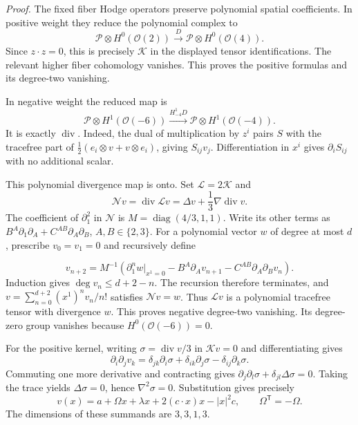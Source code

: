 \documentclass[
  english,
  11pt,
  reqno]{amsart}
\begin{document}
\emph{Proof.} The fixed fiber Hodge operators preserve polynomial
spatial coefficients. In positive weight they reduce the polynomial
complex to \[
\mathcal P\otimes H^0(\mathcal O(2))
\xrightarrow{D}\mathcal P\otimes H^0(\mathcal O(4)).
\] Since \(z\cdot z=0\), this is precisely \(\mathcal K\) in the
displayed tensor identifications. The relevant higher fiber cohomology
vanishes. This proves the positive formulas and its degree-two
vanishing.

In negative weight the reduced map is \[
\mathcal P\otimes H^1(\mathcal O(-6))
\xrightarrow{H_{-4}^1D}\mathcal P\otimes H^1(\mathcal O(-4)).
\] It is exactly \(\operatorname{div}\). Indeed, the dual of
multiplication by \(z^i\) pairs \(S\) with the tracefree part of
\(\tfrac12(e_i\otimes v+v\otimes e_i)\), giving \(S_{ij}v_j\).
Differentiation in \(x^i\) gives \(\partial_iS_{ij}\) with no additional
scalar.

This polynomial divergence map is onto. Set \(\mathcal L=2\mathcal K\)
and \[
\mathcal N v=\operatorname{div}\mathcal Lv
=\Delta v+\frac13\nabla\operatorname{div}v.
\] The coefficient of \(\partial_1^2\) in \(\mathcal N\) is
\(M=\operatorname{diag}(4/3,1,1)\). Write its other terms as
\(B^A\partial_1\partial_A+C^{AB}\partial_A\partial_B\),
\(A,B\in\{2,3\}\). For a polynomial vector \(w\) of degree at most
\(d\), prescribe \(v_0=v_1=0\) and recursively define

\label{eq:online-polynomial-navier-recursion} \[
v_{n+2}=M^{-1}\left(
\partial_1^n w|_{x^1=0}
-B^A\partial_Av_{n+1}
-C^{AB}\partial_A\partial_Bv_n
\right).
\] Induction gives \(\deg v_n\le d+2-n\). The recursion therefore
terminates, and \(v=\sum_{n=0}^{d+2}(x^1)^nv_n/n!\) satisfies
\(\mathcal Nv=w\). Thus \(\mathcal Lv\) is a polynomial tracefree tensor
with divergence \(w\). This proves negative degree-two vanishing. Its
degree-zero group vanishes because \(H^0(\mathcal O(-6))=0\).

For the positive kernel, writing \(\sigma=\operatorname{div}v/3\) in
\(\mathcal Kv=0\) and differentiating gives \[
\partial_i\partial_jv_k
=\delta_{jk}\partial_i\sigma
+\delta_{ik}\partial_j\sigma
-\delta_{ij}\partial_k\sigma.
\] Commuting one more derivative and contracting gives
\(\partial_j\partial_l\sigma+\delta_{jl}\Delta\sigma=0\). Taking the
trace yields \(\Delta\sigma=0\), hence \(\nabla^2\sigma=0\).
Substitution gives precisely \[
v(x)=a+\Omega x+\lambda x+2(c\cdot x)x-|x|^2c,
\qquad \Omega^{\mathsf T}=-\Omega.
\] The dimensions of these summands are \(3,3,1,3\).
\end{document}
